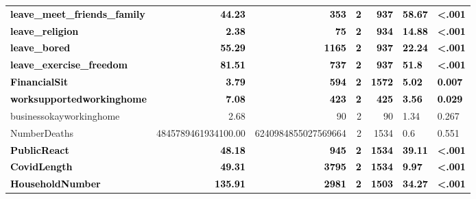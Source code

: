 \documentclass[]{article}
\begin{document}
\begin{table}[H]
\begin{tabular}[t]{lrrrrll}
\textcolor{black}{\textbf{leave\_meet\_friends\_family}} & \textcolor{black}{\textbf{44.23}} & \textcolor{black}{\textbf{353}} & \textcolor{black}{\textbf{2}} & \textcolor{black}{\textbf{937}} & \textcolor{black}{\textbf{58.67}} & \textcolor{black}{\textbf{<.001}}\\
\textcolor{black}{\textbf{leave\_religion}} & \textcolor{black}{\textbf{2.38}} & \textcolor{black}{\textbf{75}} & \textcolor{black}{\textbf{2}} & \textcolor{black}{\textbf{934}} & \textcolor{black}{\textbf{14.88}} & \textcolor{black}{\textbf{<.001}}\\
\textcolor{black}{\textbf{leave\_bored}} & \textcolor{black}{\textbf{55.29}} & \textcolor{black}{\textbf{1165}} & \textcolor{black}{\textbf{2}} & \textcolor{black}{\textbf{937}} & \textcolor{black}{\textbf{22.24}} & \textcolor{black}{\textbf{<.001}}\\
\addlinespace
\textcolor{black}{\textbf{leave\_exercise\_freedom}} & \textcolor{black}{\textbf{81.51}} & \textcolor{black}{\textbf{737}} & \textcolor{black}{\textbf{2}} & \textcolor{black}{\textbf{937}} & \textcolor{black}{\textbf{51.8}} & \textcolor{black}{\textbf{<.001}}\\
\textcolor{black}{\textbf{FinancialSit}} & \textcolor{black}{\textbf{3.79}} & \textcolor{black}{\textbf{594}} & \textcolor{black}{\textbf{2}} & \textcolor{black}{\textbf{1572}} & \textcolor{black}{\textbf{5.02}} & \textcolor{black}{\textbf{0.007}}\\
\textcolor{black}{\textbf{worksupportedworkinghome}} & \textcolor{black}{\textbf{7.08}} & \textcolor{black}{\textbf{423}} & \textcolor{black}{\textbf{2}} & \textcolor{black}{\textbf{425}} & \textcolor{black}{\textbf{3.56}} & \textcolor{black}{\textbf{0.029}}\\
businessokayworkinghome & 2.68 & 90 & 2 & 90 & 1.34 & 0.267\\
NumberDeaths & 4845789461934100.00 & 6240984855027569664 & 2 & 1534 & 0.6 & 0.551\\
\addlinespace
\textcolor{black}{\textbf{PublicReact}} & \textcolor{black}{\textbf{48.18}} & \textcolor{black}{\textbf{945}} & \textcolor{black}{\textbf{2}} & \textcolor{black}{\textbf{1534}} & \textcolor{black}{\textbf{39.11}} & \textcolor{black}{\textbf{<.001}}\\
\textcolor{black}{\textbf{CovidLength}} & \textcolor{black}{\textbf{49.31}} & \textcolor{black}{\textbf{3795}} & \textcolor{black}{\textbf{2}} & \textcolor{black}{\textbf{1534}} & \textcolor{black}{\textbf{9.97}} & \textcolor{black}{\textbf{<.001}}\\
\textcolor{black}{\textbf{HouseholdNumber}} & \textcolor{black}{\textbf{135.91}} & \textcolor{black}{\textbf{2981}} & \textcolor{black}{\textbf{2}} & \textcolor{black}{\textbf{1503}} & \textcolor{black}{\textbf{34.27}} & \textcolor{black}{\textbf{<.001}}\\
\bottomrule
\end{tabular}
\end{table}
\end{document}
